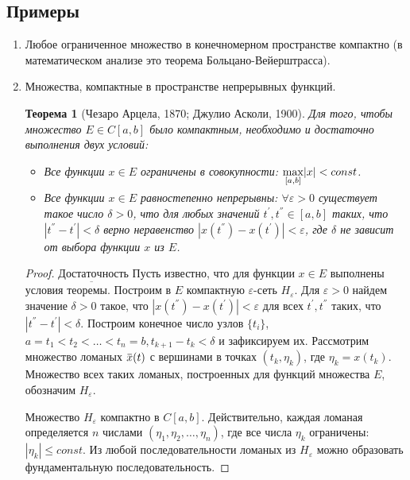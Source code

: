 \documentclass[12pt,a4paper,titlepage,oneside]{book}
\newcommand{\overbar}[1]{\mkern 1.5mu\overline{\mkern-1.5mu#1\mkern-1.5mu}\mkern 1.5mu}
\theoremstyle{definition}
\theoremstyle{plain}
\newtheorem*{theorem}{Теорема}
\theoremstyle{remark}
\theoremstyle{remark}
\theoremstyle{remark}
\theoremstyle{remark}
\theoremstyle{plain}
\theoremstyle{plain}
\begin{document}
\subsection*{Примеры}
\begin{enumerate}

	\item Любое ограниченное множество в конечномерном пространстве компактно (в математическом анализе это теорема Больцано-Вейерштрасса).

	\item Множества, компактные в пространстве непрерывных функций.

\begin{theorem} [Чезаро Арцела, 1870; Джулио Асколи, 1900]
Для того, чтобы множество $E \in C[a, b]$ было компактным, необходимо и достаточно выполнения двух условий:

\begin{itemize}

	\item  Все функции $x\in E$ ограничены в совокупности: $\smash{\displaystyle\max_{ [a,b]}} |x| < const$.

	\item  Все функции $x\in E$ равностепенно непрерывны: $\forall \varepsilon>0$ существует такое число $\delta>0$, что для любых значений $t^{'}, t^{''} \in [a, b]$ таких, что $|t^{''}-t^{'}| <\delta$ верно неравенство $|x(t^{''})-x(t^{'})| <\varepsilon$, где $\delta$ не зависит от выбора функции $x$ из $E$.
	
\end{itemize}

\end{theorem}
\begin{proof} 
	$\underbar{Достаточность}$ Пусть известно, что для функции $x\in E$ выполнены условия теоремы. Построим в $E$ компактную 	$\varepsilon$-сеть $H_{\varepsilon}$. Для 	$ \varepsilon>0$ найдем значение $\delta>0$ такое, что $|x(t^{''})-x(t^{'})| <\varepsilon$ для всех $t^{'}, t^{''}$ таких, что $|t^{''}-t^{'}| <\delta$. Построим конечное число узлов $\{t_i\}$, $a=t_1<t_2<\ldots<t_n=b, t_{k+1}-t_k< \delta$ и зафиксируем их. Рассмотрим множество ломаных $\overbar{x}(t)$ с вершинами в точках $(t_k, \eta_k )$, где $\eta_k=x(t_k)$. Множество всех таких ломаных, построенных для функций множества $E$, обозначим $H_{\varepsilon}$.
	
	Множество $H_{\varepsilon}$ компактно в $C[a, b]$. Действительно, каждая ломаная определяется $n$ числами $(\eta_1, \eta_2,\ldots,\eta_n )$, где все числа $\eta_k$ ограничены: $|\eta_k|\leqslant const$. Из любой последовательности ломаных из $H_{\varepsilon}$ можно образовать фундаментальную последовательность.
	

\end{proof}
\end{enumerate}
\end{document}

